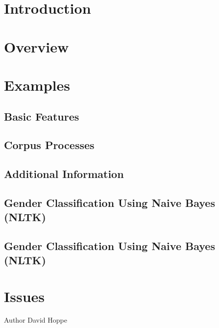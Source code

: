 \hypertarget{index_Introduction}{}\section{\-Introduction}\label{index_Introduction}
\hypertarget{index_Overview}{}\section{\-Overview}\label{index_Overview}
\hypertarget{index_Examples}{}\section{\-Examples}\label{index_Examples}
\hypertarget{_}{}\subsection{}\label{_}
\hypertarget{index_Extracting}{}\subsection{\-Basic Features}\label{index_Extracting}
\hypertarget{index_Using}{}\subsection{\-Corpus Processes}\label{index_Using}
\hypertarget{index_Including}{}\subsection{\-Additional Information}\label{index_Including}
\hypertarget{index_Example}{}\subsection{\-Gender Classification Using Naive Bayes  (\-N\-L\-T\-K)}\label{index_Example}
\hypertarget{index_Example}{}\subsection{\-Gender Classification Using Naive Bayes  (\-N\-L\-T\-K)}\label{index_Example}
\hypertarget{index_Issues}{}\section{\-Issues}\label{index_Issues}
\begin{DoxyAuthor}{\-Author}
\-David \-Hoppe 
\end{DoxyAuthor}
